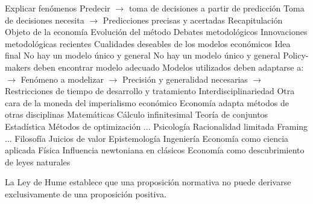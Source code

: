 \documentclass{nuevotema}
\begin{document}
\begin{esquemal}
				\4[] Explicar fenómenos
				\4[] Predecir
				\4[] $\to$ toma de decisiones a partir de predicción
				\4 Toma de decisiones necesita
				\4[] $\to$ Predicciones precisas y acertadas
	\1[] 
		\2 Recapitulación
			\3 Objeto de la economía
			\3 Evolución del método
			\3 Debates metodológicos
			\3 Innovaciones metodológicas recientes
			\3 Cualidades deseables de los modelos económicos
		\2 Idea final
			\3 No hay un modelo único y general
				\4 No hay un modelo único y general
				\4[] Policy-makers deben encontrar modelo adecuado
				\4 Modelos utilizados deben adaptarse a:
				\4[] $\to$ Fenómeno a modelizar
				\4[] $\to$ Precisión y generalidad necesarias
				\4[] $\to$ Restricciones de tiempo de desarrollo y tratamiento
			\3 Interdisciplinariedad
				\4 Otra cara de la moneda del imperialismo económico
				\4[] Economía adapta métodos de otras disciplinas
				\4 Matemáticas
				\4[] Cálculo infinitesimal
				\4[] Teoría de conjuntos
				\4[] Estadística
				\4[] Métodos de optimización
				\4[] ...
				\4 Psicología
				\4[] Racionalidad limitada
				\4[] Framing
				\4[] ...
				\4 Filosofía
				\4[] Juicios de valor
				\4[] Epistemología
				\4 Ingeniería
				\4[] Economía como ciencia aplicada
				\4 Física
				\4[] Influencia newtoniana en clásicos
				\4[] Economía como descubrimiento de leyes naturales
\end{esquemal}































\conceptos


La Ley de Hume establece que una proposición normativa no puede derivarse exclusivamente de una proposición positiva.
\end{document}
